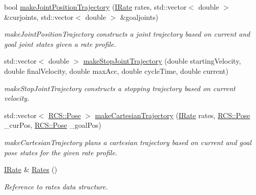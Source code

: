 \begin{DoxyCompactItemize}
bool \hyperlink{classTrajectoryMaker_a0de61ca56c1cf276adc4efe1be1f3672}{make\-Joint\-Position\-Trajectory} (\hyperlink{classRCS_1_1IRate}{I\-Rate} rates, std\-::vector$<$ double $>$ \&curjoints, std\-::vector$<$ double $>$ \&goaljoints)
\begin{DoxyCompactList}\small\item\em make\-Joint\-Position\-Trajectory constructs a joint trajectory based on current and goal joint states given a rate profile. \end{DoxyCompactList}\item 
std\-::vector$<$ double $>$ \hyperlink{classTrajectoryMaker_a4fab7f6ee775ec1cdd8685a2b068cd27}{make\-Stop\-Joint\-Trajectory} (double starting\-Velocity, double final\-Velocity, double max\-Acc, double cycle\-Time, double current)
\begin{DoxyCompactList}\small\item\em make\-Stop\-Joint\-Trajectory constructs a stopping trajectory based on current velocity. \end{DoxyCompactList}\item 
std\-::vector$<$ \hyperlink{namespaceRCS_aa07e45d8a50e30064283d2b38087f999}{R\-C\-S\-::\-Pose} $>$ \hyperlink{classTrajectoryMaker_a3f3d2d193d487311213d1fc9c09aade4}{make\-Cartesian\-Trajectory} (\hyperlink{classRCS_1_1IRate}{I\-Rate} rates, \hyperlink{namespaceRCS_aa07e45d8a50e30064283d2b38087f999}{R\-C\-S\-::\-Pose} \-\_\-cur\-Pos, \hyperlink{namespaceRCS_aa07e45d8a50e30064283d2b38087f999}{R\-C\-S\-::\-Pose} \-\_\-goal\-Pos)
\begin{DoxyCompactList}\small\item\em make\-Cartesian\-Trajectory plans a cartesian trajectory based on current and goal pose states for the given rate profile. \end{DoxyCompactList}\item 
\hyperlink{classRCS_1_1IRate}{I\-Rate} \& \hyperlink{classTrajectoryMaker_a6fc72a7ec77f674fcee7afea3441fa02}{Rates} ()
\begin{DoxyCompactList}\small\item\em Reference to rates data structure. \end{DoxyCompactList}\end{DoxyCompactItemize}
